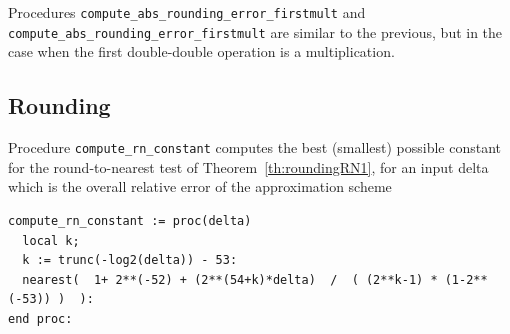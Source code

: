 Procedures \texttt{compute\_abs\_rounding\_error\_firstmult} and
\texttt{compute\_abs\_rounding\_error\_firstmult} are similar to the
previous, but in the case when the first double-double operation is a
multiplication.



\subsection{Rounding}

Procedure \texttt{compute\_rn\_constant} computes the best (smallest)
possible constant for the round-to-nearest test of
Theorem~\ref{th:roundingRN1}, for an input delta which is the overall
relative error of the approximation scheme

\begin{lstlisting}[caption={compute\_rn\_constant},firstnumber=1]
compute_rn_constant := proc(delta)
  local k;
  k := trunc(-log2(delta)) - 53: 
  nearest(  1+ 2**(-52) + (2**(54+k)*delta)  /  ( (2**k-1) * (1-2**(-53)) )  ):
end proc:
\end{lstlisting}
\vspace{0.5cm}
